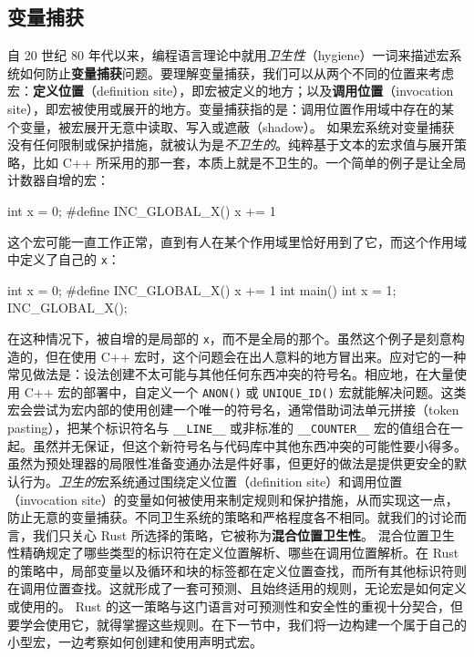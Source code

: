 \subsection{变量捕获}
\label{idx:idx_669e7023}
\label{idx:idx_be34182e}
\label{idx:idx_f9ec5565}
自 20 世纪 80 年代以来，编程语言理论中就用\emph{卫生性}（hygiene）一词来描述宏系统如何防止\textbf{变量捕获}问题。要理解变量捕获，我们可以从两个不同的位置来考虑宏：\textbf{定义位置}（definition site），即宏被定义的地方；以及\textbf{调用位置}（invocation site），即宏被使用或展开的地方。变量捕获指的是：调用位置作用域中存在的某个变量，被宏展开无意中读取、写入或遮蔽（shadow）。
如果宏系统对变量捕获没有任何限制或保护措施，就被认为是\emph{不卫生的}。纯粹基于文本的宏求值与展开策略，比如 C++ 所采用的那一套，本质上就是不卫生的。一个简单的例子是让全局计数器自增的宏：
\begin{codebox}[text]
int x = 0;
#define INC_GLOBAL_X() x += 1
\end{codebox}
这个宏可能一直工作正常，直到有人在某个作用域里恰好用到了它，而这个作用域中定义了自己的 \texttt{x}：
\begin{codebox}[text]
int x = 0;
#define INC_GLOBAL_X() x += 1
int main() {
    int x = 1;
    INC_GLOBAL_X();
}
\end{codebox}
在这种情况下，被自增的是局部的 \texttt{x}，而不是全局的那个。虽然这个例子是刻意构造的，但在使用 C++ 宏时，这个问题会在出人意料的地方冒出来。应对它的一种常见做法是：设法创建不太可能与其他任何东西冲突的符号名。相应地，在大量使用 C++ 宏的部署中，自定义一个 \texttt{ANON()} 或 \texttt{UNIQUE\_\allowbreak{}ID(\allowbreak{})\allowbreak{}} 宏就能解决问题。这类宏会尝试为宏内部的使用创建一个唯一的符号名，通常借助词法单元拼接（token pasting），把某个标识符名与 \texttt{\_\allowbreak{}\_\allowbreak{}LINE\_\allowbreak{}\_\allowbreak{}} 或非标准的 \texttt{\_\allowbreak{}\_\allowbreak{}COUNTER\_\allowbreak{}\_\allowbreak{}} 宏的值组合在一起。虽然并无保证，但这个新符号名与代码库中其他东西冲突的可能性要小得多。
\label{idx:idx_a552a6b5}
\label{idx:idx_239ccc0a}
虽然为预处理器的局限性准备变通办法是件好事，但更好的做法是提供更安全的默认行为。\emph{卫生的}宏系统通过围绕定义位置（definition site）和调用位置（invocation site）的变量如何被使用来制定规则和保护措施，从而实现这一点，防止无意的变量捕获。不同卫生系统的策略和严格程度各不相同。就我们的讨论而言，我们只关心 Rust 所选择的策略，它被称为\textbf{混合位置卫生性}。
混合位置卫生性精确规定了哪些类型的标识符在定义位置解析、哪些在调用位置解析。在 Rust 的策略中，局部变量以及循环和块的标签都在定义位置查找，而所有其他标识符则在调用位置查找。这就形成了一套可预测、且始终适用的规则，无论宏是如何定义或使用的。
Rust 的这一策略与这门语言对可预测性和安全性的重视十分契合，但要学会使用它，就得掌握这些规则。在下一节中，我们将一边构建一个属于自己的小型宏，一边考察如何创建和使用声明式宏。
